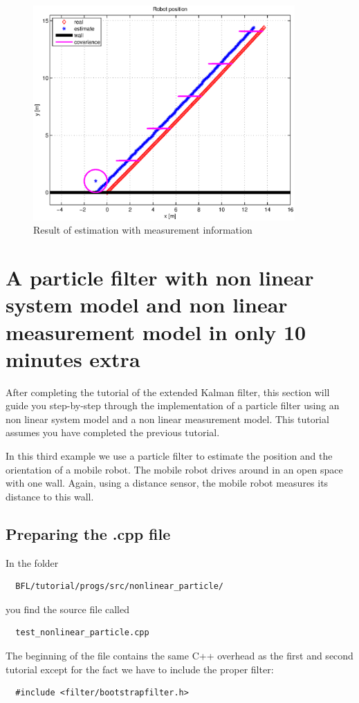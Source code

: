\documentclass[a4paper,10pt]{report}
\begin{document}
\begin{figure}
\center
\includegraphics[width=10cm]{robot_nonlinearkalman_meas.eps}
\caption{Result of estimation with measurement information}
\label{fig: nonlinear_kalman_meas}
\end{figure}










\pagebreak
\section{A particle filter with non linear system model and non linear
  measurement model in only 10 minutes extra}
After completing the tutorial of the extended Kalman filter, this
section will guide you step-by-step through the implementation of a
particle filter using an non linear system model and a non linear
measurement model. This tutorial assumes you have completed the
previous tutorial.

In this third example we use a particle filter to estimate the
position and the orientation of a mobile robot. The mobile robot
drives around in an open space with one wall. Again, using a distance
sensor, the mobile robot measures its distance to this wall.

\subsection{Preparing the .cpp file}
In the folder 
\begin{verbatim}
  BFL/tutorial/progs/src/nonlinear_particle/
\end{verbatim}
you find the source file called 
\begin{verbatim}
  test_nonlinear_particle.cpp
\end{verbatim}
The beginning of the file contains the same C++ overhead as the first
and second tutorial except for the fact we have to include the proper
filter:
\begin{verbatim}
  #include <filter/bootstrapfilter.h>
\end{verbatim}
\end{document}

